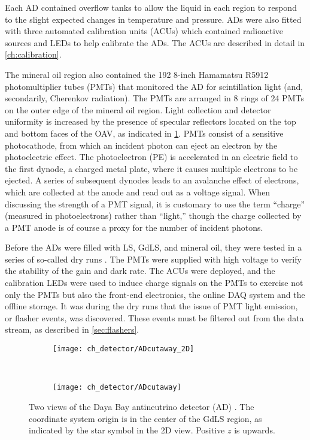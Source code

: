 Each AD contained overflow tanks to allow the liquid in each region
to respond to the slight expected changes in temperature and pressure.
ADs were also fitted with three automated calibration units (ACUs)
which contained radioactive sources and LEDs to help calibrate the ADs.
The ACUs are described in detail in \cref{ch:calibration}.

The mineral oil region also contained the 192 8-inch Hamamatsu R5912
photomultiplier tubes (PMTs) that monitored the AD for scintillation light
(and, secondarily, Cherenkov radiation).
The PMTs are arranged in 8 rings of 24 PMTs on the outer edge of the mineral oil region.
Light collection and detector uniformity is increased by the presence of
specular reflectors located on the top and bottom faces of the OAV,
as indicated in \cref{fig:ad_cutaway}.
PMTs consist of a sensitive photocathode, from which an incident photon
can eject an electron by the photoelectric effect.
The photoelectron (PE) is accelerated in an electric field to the first dynode,
a charged metal plate, where it causes multiple electrons to be ejected.
A series of subsequent dynodes leads to an avalanche effect of electrons,
which are collected at the anode and read out as a voltage signal.
When discussing the strength of a PMT signal,
it is customary to use the term ``charge'' (measured in photoelectrons)
rather than ``light,''
though the charge collected by a PMT anode
is of course a proxy for the number of incident photons.

Before the ADs were filled with LS, GdLS, and mineral oil,
they were tested in a series of so-called dry runs \cite{dryrun1}.
The PMTs were supplied with high voltage
to verify the stability of the gain and dark rate.
The ACUs were deployed, and the calibration LEDs
were used to induce charge signals on the PMTs
to exercise not only the PMTs but also the front-end electronics,
the online DAQ system and the offline storage.
It was during the dry runs that the issue of PMT light emission,
or flasher events, was discovered.
These events must be filtered out from the data stream,
as described in \cref{sec:flashers}.

\begin{figure}
    \centering
    \begin{subfigure}{\textwidth}
        \centering
        \texttt{[image: ch\_detector/ADcutaway\_2D]}
    \end{subfigure}
    \vspace{1cm}\\
    \begin{subfigure}[0.4\textheight]{\textwidth}
        \centering
        \texttt{[image: ch\_detector/ADcutaway]}
    \end{subfigure}
    \caption[Layout of a Daya Bay AD]{
        Two views of the Daya Bay antineutrino detector (AD)
        \cite{ngd2016,internal_files}.
        The coordinate system origin is in the center of the GdLS region,
        as indicated by the star symbol in the 2D view.
        Positive $z$ is upwards.
    }
    \label{fig:ad_cutaway}
\end{figure}

